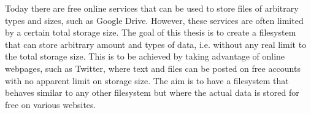 



Today there are free online services that can be used to store files of arbitrary types and sizes, such as Google Drive. However, these services are often limited by a certain total storage size. The goal of this thesis is to create a filesystem that can store arbitrary amount and types of data, i.e. without any real limit to the total storage size. This is to be achieved by taking advantage of online webpages, such as Twitter, where text and files can be posted on free accounts with no apparent limit on storage size. The aim is to have a filesystem that behaves similar to any other filesystem but where the actual data is stored for free on various websites.